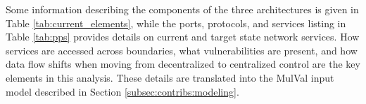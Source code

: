 Some information describing the components of the three architectures is given in Table \ref{tab:current_elements}, while the ports, protocols, and services listing in Table \ref{tab:pps} provides details on current and target state network services. How services are accessed across boundaries, what vulnerabilities are present, and how data flow shifts when moving from decentralized to centralized control are the key elements in this analysis. These details are translated into the MulVal input model described in Section \ref{subsec:contribs:modeling}. %

\begin{table}[ht]
\caption{Ports, Protocols, and Services}
\label{tab:pps}
\end{table}